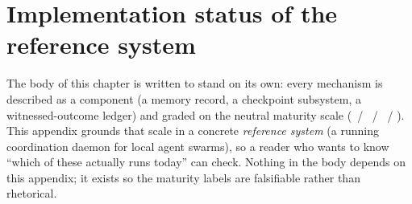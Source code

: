 \documentclass[11pt,a4paper]{article}
\theoremstyle{definition}
\begin{document}

\appendix
\section{Implementation status of the reference system}\label{app:status}

The body of this chapter is written to stand on its own: every mechanism is described
as a component (a memory record, a checkpoint subsystem, a witnessed-outcome ledger) and
graded on the neutral maturity scale (\BUILT~/ \BUILTWEAK~/ \DESIGNED~/ \VISION).
This appendix grounds that scale in a concrete \emph{reference system} (a running
coordination daemon for local agent swarms), so a reader who wants to know
``which of these actually runs today'' can check. Nothing in the body depends on
this appendix; it exists so the maturity labels are falsifiable rather than
rhetorical.
\end{document}
